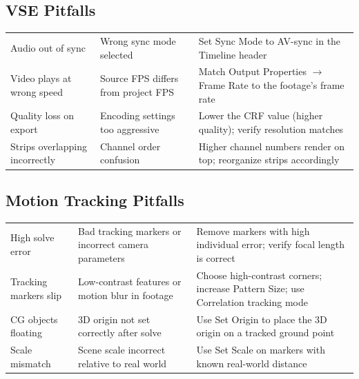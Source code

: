 \subsection{VSE Pitfalls}

\vspace{0.5em}
\begin{tabularx}{\textwidth}{L{3cm} L{3.5cm} X}
\toprule
{}
 &  &  \\
\midrule
Audio out of sync & Wrong sync mode selected & Set Sync Mode to AV-sync in the Timeline header \\
Video plays at wrong speed & Source FPS differs from project FPS & Match Output Properties $\rightarrow$ Frame Rate to the footage's frame rate \\
Quality loss on export & Encoding settings too aggressive & Lower the CRF value (higher quality); verify resolution matches \\
Strips overlapping incorrectly & Channel order confusion & Higher channel numbers render on top; reorganize strips accordingly \\
\bottomrule
\end{tabularx}
\vspace{0.5em}

\subsection{Motion Tracking Pitfalls}

\vspace{0.5em}
\begin{tabularx}{\textwidth}{L{3cm} L{3.5cm} X}
\toprule
{}
 &  &  \\
\midrule
High solve error & Bad tracking markers or incorrect camera parameters & Remove markers with high individual error; verify focal length is correct \\
Tracking markers slip & Low-contrast features or motion blur in footage & Choose high-contrast corners; increase Pattern Size; use Correlation tracking mode \\
CG objects floating & 3D origin not set correctly after solve & Use Set Origin to place the 3D origin on a tracked ground point \\
Scale mismatch & Scene scale incorrect relative to real world & Use Set Scale on markers with known real-world distance \\
\bottomrule
\end{tabularx}
\vspace{0.5em}

